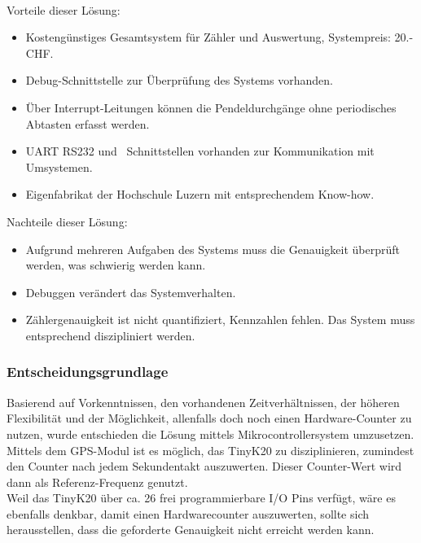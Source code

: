         \\
    	Vorteile dieser Lösung:
    	\begin{itemize}
    		\item Kostengünstiges Gesamtsystem für Zähler und Auswertung, Systempreis: 20.- CHF.
    		\item Debug-Schnittstelle zur Überprüfung des Systems vorhanden.
    		\item Über Interrupt-Leitungen können die Pendeldurchgänge ohne periodisches Abtasten erfasst werden.
    		\item UART RS232 und \iic\ Schnittstellen vorhanden zur Kommunikation mit Umsystemen.
    		\item Eigenfabrikat der Hochschule Luzern mit entsprechendem Know-how.
    	\end{itemize}
    	Nachteile dieser Lösung:
    	\begin{itemize}
    		\item Aufgrund mehreren Aufgaben des Systems muss die Genauigkeit überprüft werden, was schwierig werden kann.
    		\item Debuggen verändert das Systemverhalten.
    		\item Zählergenauigkeit ist nicht quantifiziert, Kennzahlen fehlen. Das System muss entsprechend diszipliniert werden.
    	\end{itemize}
    \subsubsection{Entscheidungsgrundlage}
		Basierend auf Vorkenntnissen, den vorhandenen Zeitverhältnissen, der höheren Flexibilität und der Möglichkeit, allenfalls doch noch einen Hardware-Counter zu nutzen, wurde entschieden die Lösung mittels Mikrocontrollersystem umzusetzen. Mittels dem GPS-Modul ist es möglich, das TinyK20 zu disziplinieren, zumindest den Counter nach jedem Sekundentakt auszuwerten. Dieser Counter-Wert wird dann als Referenz-Frequenz genutzt.\\
		Weil das TinyK20 über ca. 26 frei programmierbare I/O Pins verfügt, wäre es ebenfalls denkbar, damit einen Hardwarecounter auszuwerten, sollte sich herausstellen, dass die geforderte Genauigkeit nicht erreicht werden kann.
%
%
\clearpage
